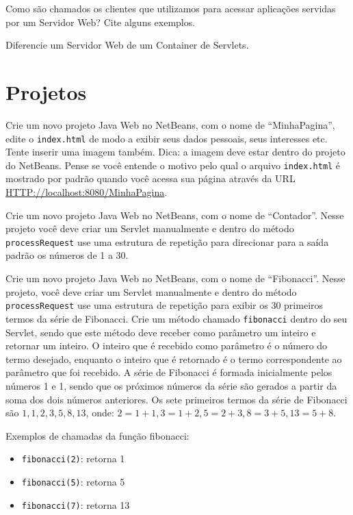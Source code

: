 \begin{exercicioSemArquivo}{}{}{}
    Como são chamados os clientes que utilizamos para acessar aplicações servidas por um Servidor Web? Cite alguns exemplos.
\end{exercicioSemArquivo}

\begin{exercicioSemArquivo}{}{}{}
    Diferencie um Servidor Web de um Container de Servlets.
\end{exercicioSemArquivo}


\section{Projetos}

\begin{projetoSemArquivo}{}{}{}
    Crie um novo projeto Java Web no NetBeans, com o nome de ``MinhaPagina'', edite o \texttt{index.html} de modo a exibir seus dados pessoais, seus interesses etc. Tente inserir uma imagem também. Dica: a imagem deve estar dentro do projeto do NetBeans. Pense se você entende o motivo pelo qual o arquivo \texttt{index.html} é mostrado por padrão quando você acessa sua página através da URL \url{HTTP://localhost:8080/MinhaPagina}.
\end{projetoSemArquivo}

\begin{projetoSemArquivo}{}{}{}
    Crie um novo projeto Java Web no NetBeans, com o nome de ``Contador''. Nesse projeto você deve criar um Servlet manualmente e dentro do método \texttt{processRequest} use uma estrutura de repetição para direcionar para a saída padrão os números de 1 a 30.
\end{projetoSemArquivo}

\begin{projetoSemArquivo}{}{}{}
    Crie um novo projeto Java Web no NetBeans, com o nome de ``Fibonacci''. Nesse projeto, você deve criar um Servlet manualmente e dentro do método \texttt{processRequest} use uma estrutura de repetição para exibir os 30 primeiros termos da série de Fibonacci. Crie um método chamado \texttt{fibonacci} dentro do seu Servlet, sendo que este método deve receber como parâmetro um inteiro e retornar um inteiro. O inteiro que é recebido como parâmetro é o número do termo desejado, enquanto o inteiro que é retornado é o termo correspondente ao parâmetro que foi recebido. A série de Fibonacci é formada inicialmente pelos números 1 e 1, sendo que os próximos números da série são gerados a partir da soma dos dois números anteriores. Os sete primeiros termos da série de Fibonacci são $1, 1, 2, 3, 5, 8, 13$, onde: $2 = 1 + 1, 3 = 1 + 2, 5 = 2 + 3, 8 = 3 + 5, 13 = 5 + 8$.
    
    Exemplos de chamadas da função fibonacci:
    \begin{itemize}
        \item \texttt{fibonacci(2)}: retorna 1
        \item \texttt{fibonacci(5)}: retorna 5
        \item \texttt{fibonacci(7)}: retorna 13
    \end{itemize}
    
\end{projetoSemArquivo}